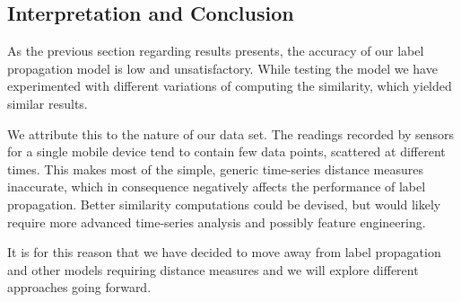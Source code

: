 \subsection{Interpretation and Conclusion}
As the previous section regarding results presents, the accuracy of our label propagation model is low and unsatisfactory. While testing the model we have experimented with different variations of computing the similarity, which yielded similar results. \par
\medskip
We attribute this to the nature of our data set. The readings recorded by sensors for a single mobile device tend to contain few data points, scattered at different times. This makes most of the simple, generic time-series distance measures inaccurate, which in consequence negatively affects the performance of label propagation. Better similarity computations could be devised, but would likely require more advanced time-series analysis and possibly feature engineering. \par
\medskip
It is for this reason that we have decided to move away from label propagation and other models requiring distance measures and we will explore different approaches going forward.


